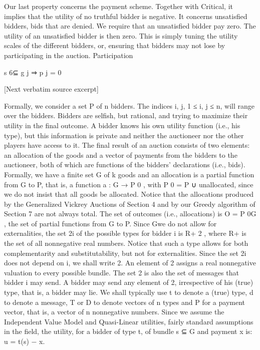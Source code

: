 \documentclass[10pt]{article}
\begin{document}
\begin{ReviewVerbatim}
Our last property concerns the payment scheme. Together with Critical, it implies
that the utility of no truthful bidder is negative. It concerns unsatisfied bidders, bids
that are denied. We require that an unsatisfied bidder pay zero. The utility of an
unsatisfied bidder is then zero. This is simply tuning the utility scales of the different
bidders, or, ensuring that bidders may not lose by participating in the auction.
Participation

s 6⊆ g j ⇒ p j = 0

[Next verbatim source excerpt]

Formally, we consider a set P of n bidders. The indices i, j, 1 ≤ i, j ≤ n, will
range over the bidders. Bidders are selfish, but rational, and trying to maximize their
utility in the final outcome. A bidder knows his own utility function (i.e., his type),
but this information is private and neither the auctioneer nor the other players have
access to it. The final result of an auction consists of two elements: an allocation
of the goods and a vector of payments from the bidders to the auctioneer, both of
which are functions of the bidders’ declarations (i.e., bids). Formally, we have a
finite set G of k goods and an allocation is a partial function from G to P, that is, a
function a : G → P 0 , with P 0 = P ∪ {unallocated}, since we do not insist that all
goods be allocated. Notice that the allocations produced by the Generalized Vickrey
Auctions of Section 4 and by our Greedy algorithm of Section 7 are not always
total. The set of outcomes (i.e., allocations) is O = P 0G , the set of partial functions
from G to P. Since Gwe do not allow for externalities, the set 2i of the possible types
for bidder i is R+ 2 , where R+ is the set of all nonnegative real numbers. Notice
that such a type allows for both complementarity and substitutability, but not for
externalities. Since the set 2i does not depend on i, we shall write 2. An element
of 2 assigns a real nonnegative valuation to every possible bundle. The set 2 is
also the set of messages that bidder i may send. A bidder may send any element of
2, irrespective of his (true) type, that is, a bidder may lie. We shall typically use t
to denote a (true) type, d to denote a message, T or D to denote vectors of n types
and P for a payment vector, that is, a vector of n nonnegative numbers.
Since we assume the Independent Value Model and Quasi-Linear utilities, fairly
standard assumptions in the field, the utility, for a bidder of type t, of bundle s ⊆ G
and payment x is:
u = t(s) − x.


\end{ReviewVerbatim}
\end{document}

